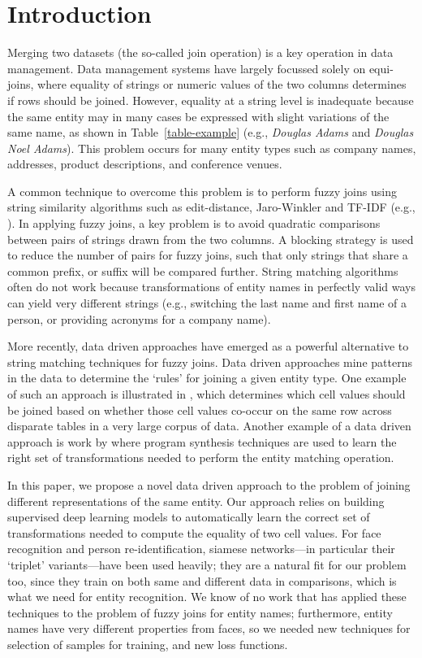 \section{Introduction}

Merging two datasets (the so-called join operation) is a key operation in data management.  Data management systems have largely focussed solely on equi-joins, where equality of strings or numeric values of the two columns determines if rows should be joined.  However, equality at a string level is inadequate because the same entity may in many cases be expressed with slight variations of the same name, as shown in Table~\ref{table-example} (e.g., \textit{Douglas Adams} and \textit{Douglas Noel Adams}).  This problem occurs for many entity types such as company names, addresses, product descriptions, and conference venues.

A common technique to overcome this problem is to perform fuzzy joins using string similarity algorithms such as edit-distance, Jaro-Winkler and TF-IDF (e.g., \cite{Cohen2003}).  In applying fuzzy joins, a key problem is to avoid quadratic comparisons between pairs of strings drawn from the two columns.  A blocking strategy is used to reduce the number of pairs for fuzzy joins, such that only strings that share a common prefix, or suffix will be compared further.  String matching algorithms often do not work because transformations of entity names in perfectly valid ways can yield very different strings (e.g., switching the last name and first name of a person, or providing acronyms for a company name).

More recently, data driven approaches have emerged as a powerful alternative to string matching techniques for fuzzy joins.  Data driven approaches mine patterns in the data to determine the `rules' for joining a given entity type.  One example of such an approach is illustrated in \cite{He:2015:SJS:2824032.2824036}, which determines which cell values should be joined based on whether those cell values co-occur on the same row across disparate tables in a very large corpus of data.  Another example of a data driven approach is work by \cite{auto-join-joining-tables-leveraging-transformations} where program synthesis techniques are used to learn the right set of transformations needed to perform the entity matching operation.  



In this paper, we propose a novel data driven approach to the problem of joining different representations of the same entity.  Our approach relies on building supervised deep learning models to automatically learn the correct set of transformations needed to compute the equality of two cell values.  For face recognition and person re-identification, siamese networks---in particular their `triplet' variants---have been used heavily; they are a natural fit for our problem too, since they train on both same and different data in comparisons, which is what we need for entity recognition.  We know of no work that has applied these techniques to the problem of fuzzy joins for entity names; furthermore, entity names have very different properties from faces, so we needed new techniques for selection of samples for training, and new loss functions.   

